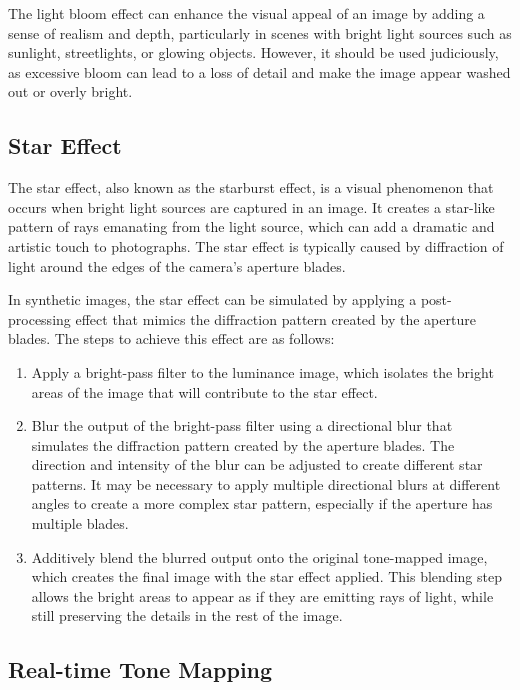 The light bloom effect can enhance the visual appeal of an image by adding a sense of realism and depth, particularly in scenes with bright light sources such as sunlight, streetlights, or glowing objects. However, it should be used judiciously, as excessive bloom can lead to a loss of detail and make the image appear washed out or overly bright.

\subsection{Star Effect}

The star effect, also known as the starburst effect, is a visual phenomenon that occurs when bright light sources are captured in an image. It creates a star-like pattern of rays emanating from the light source, which can add a dramatic and artistic touch to photographs. The star effect is typically caused by diffraction of light around the edges of the camera's aperture blades.

In synthetic images, the star effect can be simulated by applying a post-processing effect that mimics the diffraction pattern created by the aperture blades. The steps to achieve this effect are as follows:
\begin{enumerate}
    \item Apply a bright-pass filter to the luminance image, which isolates the bright areas of the image that will contribute to the star effect.
    \item Blur the output of the bright-pass filter using a directional blur that simulates the diffraction pattern created by the aperture blades. The direction and intensity of the blur can be adjusted to create different star patterns. It may be necessary to apply multiple directional blurs at different angles to create a more complex star pattern, especially if the aperture has multiple blades.
    \item Additively blend the blurred output onto the original tone-mapped image, which creates the final image with the star effect applied. This blending step allows the bright areas to appear as if they are emitting rays of light, while still preserving the details in the rest of the image.
\end{enumerate}

\subsection{Real-time Tone Mapping}

